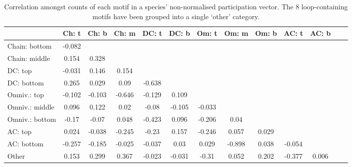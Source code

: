 \documentclass[12pt]{article}
\begin{document}
\begin{spacing}{2.0}
		\begin{table}[h!]
    		\caption{Correlation amongst counts of each motif in a species' non-normalised participation vector. The 8 loop-containing motifs have been grouped into a single `other' category.}
    		\label{tab:position_Z_correlations}
    		\footnotesize
    		\begin{tabular}{l | c c c c c c c c c c c c}    
        		&	Ch: t	&	Ch: b	&	Ch: m	&	DC: t	&	DC: b	&	Om: t	&	Om: m	&	Om: b	&	AC: t	& AC: b\\
        		\hline
                Chain: bottom	&	-0.082	&		&		&		&		&		&		&		&		&		\\
                Chain: middle	&	0.154	&	0.328	&		&		&		&		&		&		&		&		\\
                DC: top	&	-0.031	&	0.146	&	0.154	&		&		&		&		&		&		&		\\
                DC: bottom	&	0.265	&	0.029	&	0.09	&	-0.638	&		&		&		&		&		&		\\
                Omniv.: top	&	-0.102	&	-0.103	&	-0.646	&	-0.129	&	0.109	&		&		&		&		&		\\
                Omniv.: middle	&	0.096	&	0.122	&	0.02	&	-0.08	&	-0.105	&	-0.033	&		&		&		&		\\
                Omniv.: bottom	&	-0.17	&	-0.07	&	0.048	&	-0.423	&	0.096	&	-0.206	&	0.04	&		&		&		\\
                AC: top	&	0.024	&	-0.038	&	-0.245	&	-0.23	&	0.157	&	-0.246	&	0.057	&	0.029	&		&		\\
                AC: bottom	&	-0.257	&	-0.185	&	-0.025	&	-0.037	&	0.03	&	0.029	&	-0.898	&	0.038	&	-0.054	&		\\
                Other	&	0.153	&	0.299	&	0.367	&	-0.023	&	-0.031	&	-0.31	&	0.052	&	0.202	&	-0.377	&	0.006	\\
            \hline
            \end{tabular}
            \end{table}




\clearpage















\end{spacing}
\end{document}
